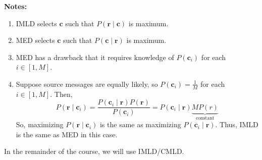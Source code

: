 \textbf{Notes:}
\begin{enumerate}[label=(\roman*)]
    \item IMLD selects $ \bm{c} $ such that $ P(\bm{r}\mid \bm{c}) $ is maximum.
    \item MED selects $ \bm{c} $ such that $ P(\bm{c}\mid \bm{r}) $ is maximum.
    \item MED has a drawback that it requires knowledge of $ P(\bm{c}_i) $ for
          each $ i\in [1,M] $.
    \item Suppose source messages are equally likely, so
          $ P(\bm{c}_i)=\frac{1}{M} $ for each $ i\in[1,M] $.
          Then,
          \[ P(\bm{r}\mid \bm{c}_i)=\frac{P(\bm{c}_i\mid \bm{r})P(\bm{r})}{P(\bm{c}_i)}
              =P(\bm{c}_i\mid \bm{r}) \underbrace{M P(r)}_{\text{constant}}\]
          So, maximizing $ P(\bm{r}\mid \bm{c}_i) $ is the same as maximizing
          $ P(\bm{c}_i\mid \bm{r}) $. Thus, IMLD is the same as MED in this case.
\end{enumerate}
In the remainder of the course, we will use IMLD/CMLD\@.
